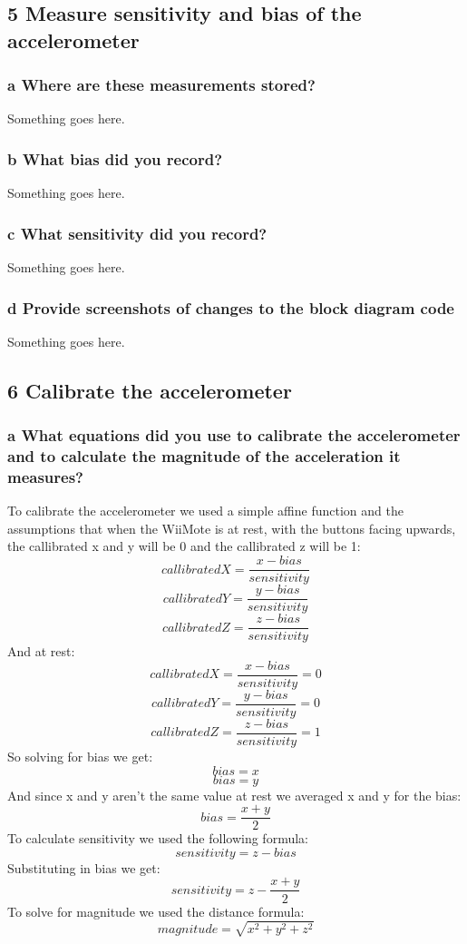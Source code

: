 \documentclass[10pt,a4paper]{article}
\begin{document}
  \subsection*{5 Measure sensitivity and bias of the accelerometer}
    \subsubsection*{a Where are these measurements stored?}
      Something goes here.
    \subsubsection*{b What bias did you record?}
      Something goes here.
    \subsubsection*{c What sensitivity did you record?}
      Something goes here.
    \subsubsection*{d Provide screenshots of changes to the block diagram code}
      Something goes here.
  \subsection*{6 Calibrate the accelerometer}
    \subsubsection*{a What equations did you use to calibrate the accelerometer and to calculate the magnitude of the acceleration it measures?}
      To calibrate the accelerometer we used a simple affine function and the assumptions that when the WiiMote is at rest, with the buttons facing upwards, the callibrated x and y will be 0 and the callibrated z will be 1: 
        \[callibratedX = \frac{x - bias}{sensitivity}\] 
        \[callibratedY = \frac{y - bias}{sensitivity}\] 
        \[callibratedZ = \frac{z - bias}{sensitivity}\] 
      And at rest:
        \[callibratedX = \frac{x - bias}{sensitivity} = 0\] 
        \[callibratedY = \frac{y - bias}{sensitivity} = 0\] 
        \[callibratedZ = \frac{z - bias}{sensitivity} = 1\] 
      So solving for bias we get:
        \[bias = x\]
        \[bias = y\]
      And since x and y aren't the same value at rest we averaged x and y for the bias:
        \[bias = \frac{x + y}{2}\]
      To calculate sensitivity we used the following formula:
        \[sensitivity = z - bias\]
      Substituting in bias we get:
        \[sensitivity = z - \frac{x + y}{2}\]
      To solve for magnitude we used the distance formula:
        \[magnitude = \sqrt{x^2 + y^2 + z^2}\]
\end{document}
